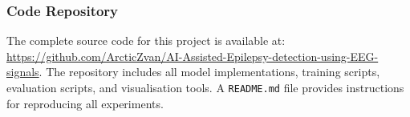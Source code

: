 \subsubsection*{Code Repository}

The complete source code for this project is available at: \url{https://github.com/ArcticZvan/AI-Assisted-Epilepsy-detection-using-EEG-signals}. The repository includes all model implementations, training scripts, evaluation scripts, and visualisation tools. A \texttt{README.md} file provides instructions for reproducing all experiments.
